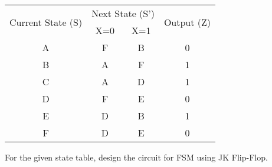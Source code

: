 \documentclass[12pt]{article}
\begin{document}
\begin{center}
    \begin{tabular}{|c|cc|c|}
        \hline
        \multirow{2}{*}{Current State (S)} & \multicolumn{2}{c|}{Next State (S')} & \multirow{2}{*}{Output (Z)}     \\ \cline{2-3}
                                           & \multicolumn{1}{c|}{X=0}             & X=1                         &   \\ \hline
        A                                  & \multicolumn{1}{c|}{F  }             & B                           & 0 \\ \hline
        B                                  & \multicolumn{1}{c|}{A  }             & F                           & 1 \\ \hline
        C                                  & \multicolumn{1}{c|}{A  }             & D                           & 1 \\ \hline
        D                                  & \multicolumn{1}{c|}{F  }             & E                           & 0 \\ \hline
        E                                  & \multicolumn{1}{c|}{D  }             & B                           & 1 \\ \hline
        F                                  & \multicolumn{1}{c|}{D  }             & E                           & 0 \\ \hline
    \end{tabular}
\end{center}

For the given state table, design the circuit for FSM using JK Flip-Flop.
\end{document}
